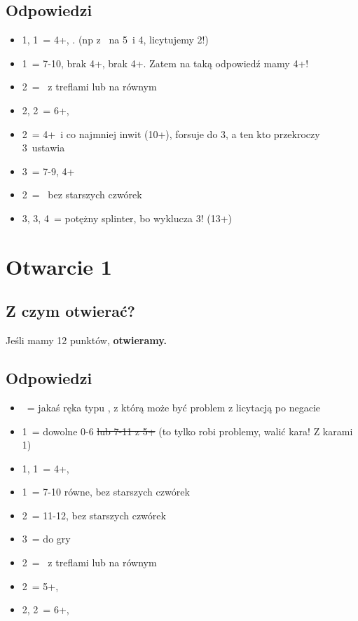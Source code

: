\documentclass[12pt, a4paper]{article}
\begin{document}
\subsection*{Odpowiedzi}
\begin{itemize}
    \item 1\hearts, 1\spades\ = 4+, \fonce.
    (np z \gf\ na 5\clubs\ i 4\hearts, licytujemy 2\clubs!)
    \item 1\nt\ = 7-10, brak 4+\major, brak 4+\diams. Zatem na taką odpowiedź mamy 4+\clubs!
    \item 2\clubs\ = \gf\ z treflami lub na równym
    \item 2\hearts, 2\spades\ = 6+, \gf
    \item 2\diams\ = 4+\diams\ i co najmniej inwit (10+), forsuje do 3\diams, a ten kto przekroczy 3\diams\
    ustawia \gf
    \item 3\diams\ = 7-9, 4+\diams
    \item 2\nt\ = \inv\ bez starszych czwórek
    \item 3\hearts, 3\spades, 4\clubs\ = potężny splinter, bo wyklucza 3\nt! (13+) 
\end{itemize}


\pagebreak
\section{Otwarcie 1\clubs}
\subsection*{Z czym otwierać?}
\begin{formal}
    Jeśli mamy 12 punktów, \textbf{otwieramy.}
\end{formal}

\subsection*{Odpowiedzi}
\begin{itemize}
    \item \pass\ = jakaś ręka typu , z którą może być problem z licytacją po negacie
    \item 1\diams\ = dowolne 0-6 \st{lub 7-11 z 5+\diams} (to tylko robi problemy, walić kara! Z karami 1\nt)
    \item 1\hearts, 1\spades\ = 4+, \fonce
    \item 1\nt\ = 7-10 równe, bez starszych czwórek
    \item 2\nt\ = 11-12, bez starszych czwórek
    \item 3\nt\ = do gry
    \item 2\clubs\ = \gf\ z treflami lub na równym
    \item 2\diams\ = 5+, \gf
    \item 2\hearts, 2\spades\ = 6+, \gf
\end{itemize}
\end{document}
